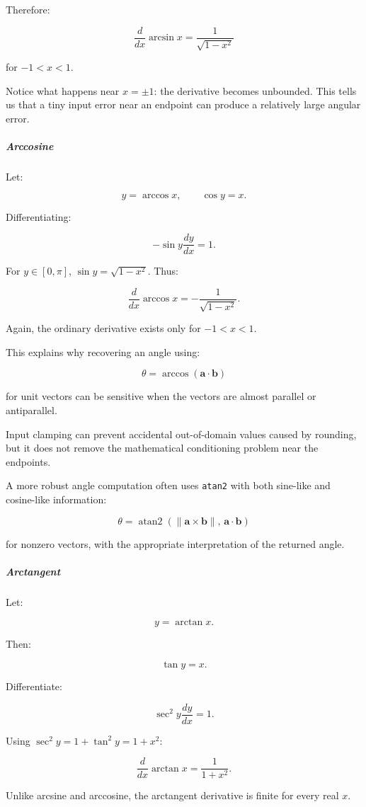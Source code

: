Therefore:

\[
\boxed{\frac d{dx}\arcsin x=\frac1{\sqrt{1-x^2}}}
\]

for \(-1<x<1\).

Notice what happens near \(x=\pm1\): the derivative becomes unbounded. This tells us that a tiny input error near an endpoint can produce a relatively large angular error.

\subparagraph{Arccosine}\label{01-foundations-i-ch020-arccosine}

Let:

\[
y=\arccos x,\qquad\cos y=x.
\]

Differentiating:

\[
-\sin y\frac{dy}{dx}=1.
\]

For \(y\in[0,\pi]\), \(\sin y=\sqrt{1-x^2}\). Thus:

\[
\boxed{\frac d{dx}\arccos x=-\frac1{\sqrt{1-x^2}}}.
\]

Again, the ordinary derivative exists only for \(-1<x<1\).

This explains why recovering an angle using:

\[
\theta=\arccos(\mathbf a\cdot\mathbf b)
\]

for unit vectors can be sensitive when the vectors are almost parallel or antiparallel.

Input clamping can prevent accidental out-of-domain values caused by rounding, but it does not remove the mathematical conditioning problem near the endpoints.

A more robust angle computation often uses \texttt{atan2} with both sine-like and cosine-like information:

\[
\theta=\operatorname{atan2} \left(\|\mathbf a\times\mathbf b\|,\, \mathbf a\cdot\mathbf b\right)
\]

for nonzero vectors, with the appropriate interpretation of the returned angle.

\subparagraph{Arctangent}\label{01-foundations-i-ch020-arctangent}

Let:

\[
y=\arctan x.
\]

Then:

\[
\tan y=x.
\]

Differentiate:

\[
\sec^2y\frac{dy}{dx}=1.
\]

Using \(\sec^2y=1+\tan^2y=1+x^2\):

\[
\boxed{\frac d{dx}\arctan x=\frac1{1+x^2}}.
\]

Unlike arcsine and arccosine, the arctangent derivative is finite for every real \(x\).

